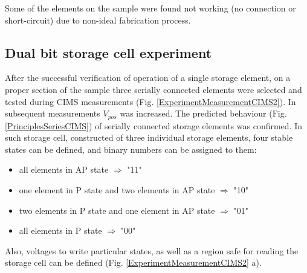     Some of the elements on the sample were found not working (no connection or short-circuit) due to non-ideal fabrication process.
    
\subsection{Dual bit storage cell experiment} \label{sec:ExperimentMeasurementsDual}
    
    After the successful verification of operation of a single storage element, on a proper section of the sample three serially connected elements were selected and tested during CIMS measurements (Fig. \ref{ExperimentMeasurementCIMS2}). In subsequent measurements $V_{pos}$ was increased. The predicted behaviour (Fig. \ref{PrinciplesSeriesCIMS}) of serially connected storage elements was confirmed. In such storage cell, constructed of three individual storage elements, four stable states can be defined, and binary numbers can be assigned to them: 
    
    \begin{itemize}[noitemsep,label=\textbullet]
    	\item all elements in AP state $\Longrightarrow$ "11"
    	\item one element in P state and two elements in AP state $\Longrightarrow$ "10"
    	\item two elements in P state and one element in AP state $\Longrightarrow$ "01"
    	\item all elements in P state $\Longrightarrow$ "00"
    \end{itemize}
    
    Also, voltages to write particular states, as well as a region safe for reading the storage cell can be defined (Fig. \ref{ExperimentMeasurementCIMS2} a). 
    
